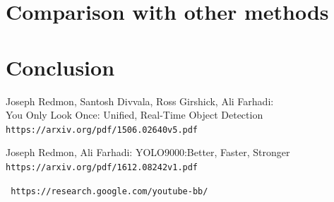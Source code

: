 \documentclass{article}
\begin{document}
\section*{Comparison with other methods}


\section*{Conclusion}




\newpage
\begin{thebibliography}{9}

Joseph Redmon, Santosh Divvala, Ross Girshick, Ali Farhadi:
\\You Only Look Once: Unified, Real-Time Object Detection
\\\texttt{https://arxiv.org/pdf/1506.02640v5.pdf}

Joseph Redmon, Ali Farhadi: YOLO9000:Better, Faster, Stronger
\\\texttt{https://arxiv.org/pdf/1612.08242v1.pdf}

\texttt{ https://research.google.com/youtube-bb/}

\end{thebibliography}
\end{document}
